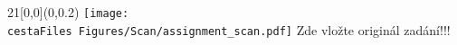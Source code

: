 ﻿\begin{textblock}{21}[0,0](0,0.2)
    \ifnum {}
        \texttt{[image: \\cestaFiles Figures/Scan/assignment\_scan.pdf]}
    \else
        \vglue 13cm
        \hspace{5cm}
        {\huge Zde vložte originál zadání!!!}
    \fi
\end{textblock}


